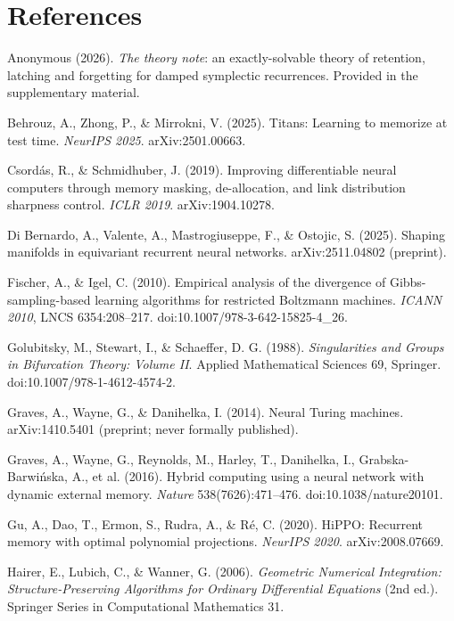 \documentclass{article}
\begin{document}
\section*{References}
{\footnotesize
\begingroup
\setlength{\parindent}{-0.22in}\setlength{\leftskip}{0.22in}\setlength{\parskip}{2pt}

Anonymous (2026). \emph{The theory note}: an exactly-solvable theory of retention, latching and forgetting for damped symplectic recurrences. Provided in the supplementary material.\par
Behrouz, A., Zhong, P., \& Mirrokni, V. (2025). Titans: Learning to memorize at test time. \emph{NeurIPS 2025}. arXiv:2501.00663.\par
Csord\'as, R., \& Schmidhuber, J. (2019). Improving differentiable neural computers through memory masking, de-allocation, and link distribution sharpness control. \emph{ICLR 2019}. arXiv:1904.10278.\par
Di Bernardo, A., Valente, A., Mastrogiuseppe, F., \& Ostojic, S. (2025). Shaping manifolds in equivariant recurrent neural networks. arXiv:2511.04802 (preprint).\par
Fischer, A., \& Igel, C. (2010). Empirical analysis of the divergence of Gibbs-sampling-based learning algorithms for restricted Boltzmann machines. \emph{ICANN 2010}, LNCS 6354:208--217. doi:10.1007/978-3-642-15825-4\_26.\par
Golubitsky, M., Stewart, I., \& Schaeffer, D. G. (1988). \emph{Singularities and Groups in Bifurcation Theory: Volume II}. Applied Mathematical Sciences 69, Springer. doi:10.1007/978-1-4612-4574-2.\par
Graves, A., Wayne, G., \& Danihelka, I. (2014). Neural Turing machines. arXiv:1410.5401 (preprint; never formally published).\par
Graves, A., Wayne, G., Reynolds, M., Harley, T., Danihelka, I., Grabska-Barwi\'nska, A., et al. (2016). Hybrid computing using a neural network with dynamic external memory. \emph{Nature} 538(7626):471--476. doi:10.1038/nature20101.\par
Gu, A., Dao, T., Ermon, S., Rudra, A., \& R\'e, C. (2020). HiPPO: Recurrent memory with optimal polynomial projections. \emph{NeurIPS 2020}. arXiv:2008.07669.\par
Hairer, E., Lubich, C., \& Wanner, G. (2006). \emph{Geometric Numerical Integration: Structure-Preserving Algorithms for Ordinary Differential Equations} (2nd ed.). Springer Series in Computational Mathematics 31.\par
}
\end{document}
